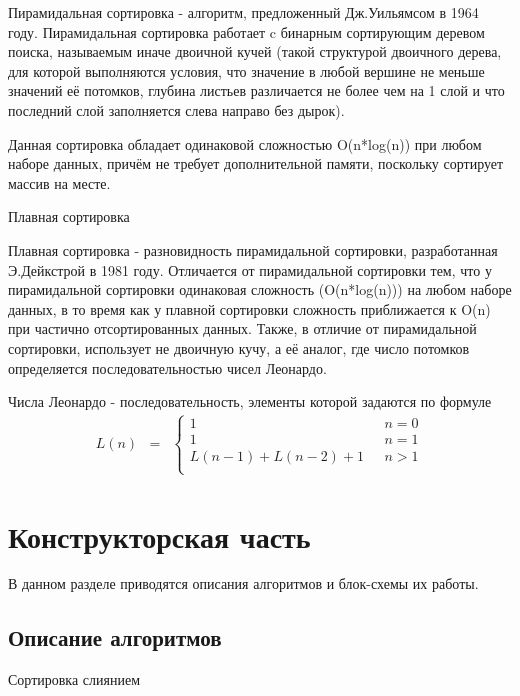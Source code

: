 \documentclass[12pt,a4paper]{scrartcl}
\begin{document}
Пирамидальная сортировка - алгоритм, предложенный Дж.Уильямсом в 1964 году. Пирамидальная сортировка работает c бинарным сортирующим деревом поиска, называемым иначе двоичной кучей (такой структурой двоичного дерева, для которой выполняются условия, что значение в любой вершине не меньше значений её потомков, глубина листьев различается не более чем на 1 слой и что последний слой заполняется слева направо без дырок). \cite{Alg}

Данная сортировка обладает одинаковой сложностью O(n*log(n)) при любом наборе данных, причём не требует дополнительной памяти, поскольку сортирует массив на месте. \cite{Alg}

\begin{center}
Плавная сортировка
\end{center}

Плавная сортировка - разновидность пирамидальной сортировки, разработанная Э.Дейкстрой в 1981 году. Отличается от пирамидальной сортировки тем, что у пирамидальной сортировки одинаковая сложность (O(n*log(n))) на любом наборе данных, в то время как у плавной сортировки сложность приближается к O(n) при частично отсортированных данных. Также, в отличие от пирамидальной сортировки, использует не двоичную кучу, а её аналог, где число потомков определяется последовательностью чисел Леонардо. \cite{SmS}

Числа Леонардо - последовательность, элементы которой задаются по формуле
\begin{equation}\label{eq1.1}
\begin{matrix}
L(n) & = 
& \left\{
\begin{matrix}
1 & \mbox{ } n = 0 \\
1 & \mbox{ } n = 1 \\
L(n-1)+L(n-2)+1 & \mbox{ } n > 1 \\
\end{matrix} \right.
\end{matrix}
\end{equation}
\cite{Smooth}

\newpage
\section{Конструкторская часть}

В данном разделе приводятся описания алгоритмов и блок-схемы их работы.

\subsection{Описание алгоритмов}
\begin{center}
Сортировка слиянием
\end{center}
\end{document}
